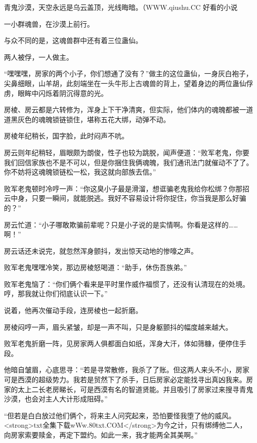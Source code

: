 
\begin{this_body}

青鬼沙漠，天空永远是乌云盖顶，光线晦暗。（WWW.qiushu.CC 好看的小说

一小群魂兽，在沙漠上前行。

与众不同的是，这魂兽群中还有着三位蛊仙。

两人被俘，一人做主。

“嘿嘿嘿，房家的两个小子，你们想通了没有？”做主的这位蛊仙，一身灰白袍子，尖鼻细眼，山羊胡，此刻端坐在一头牛形上古魂兽的背上，望着身边的两位蛊仙俘虏，眼眸中闪烁着阴沉得意的光。

房棱、房云都是六转修为，浑身上下干净清爽，但实际，他们体内的魂魄都被一道道黑灰色的魂魄锁链锁住，堪称五花大绑，动弹不动。

房棱年纪稍长，国字脸，此时闷声不吭。

房云则年纪稍轻，眉眼颇为朗俊，性子也较为跳脱，闻声便道：“败军老鬼，你要我们回信家族也不是不可以，但是你捆住我俩魂魄，我们通讯法门就催动不了了。你不妨将这魂魄锁链松一松，我这就向部族去信。”

败军老鬼顿时冷哼一声：“你这臭小子最是滑溜，想诓骗老鬼我给你松绑？你那招云中身，只要一瞬间，就能脱逃。我好不容易设计将你捉住，你当我是那么好骗的？”

房云忙道：“小子哪敢欺骗前辈呢？只是小子说的是实情啊。你看是这样的……啊！”

房云话还未说完，就忽然浑身颤抖，发出惊天动地的惨嚎之声。

败军老鬼嘿嘿冷笑，那边房棱怒喝道：“助手，休伤吾族弟。”

败军老鬼恼了：“你们俩个看来是平时里作威作福惯了，还没有认清现在的处境。哼，那我就让你们彻底认识一下。”

说着，他再次催动手段，连房棱也一起折磨。

房棱闷哼一声，眉头紧皱，却是一声不叫，只是身躯颤抖的幅度越来越大。

败军老鬼折磨一阵，见房家两人俱都面白如纸，浑身大汗，体如筛糠，便停住手段。

他暗自皱眉，心底思寻：“若是寻常散修，我杀了了账。但这两人来头不小，房家可是西漠的超级势力。我若是贸然下了杀手，日后房家必定能找寻出真凶我来。房家的太上二长老房睇长，可是西漠有名的智道贤能。并且吸引了房家过来搜寻青鬼沙漠，也会对主人大计形成阻碍。”

“但若是白白放过他们俩个，将来主人问究起来，恐怕要怪我堕了他的威风。<strong>txt全集下载wWw.80txt.COM</strong>为今之计，只有绑缚他二人，向房家索要赎金，再定下盟约。如此一来，我才能两全其美啊。”


\end{this_body}
